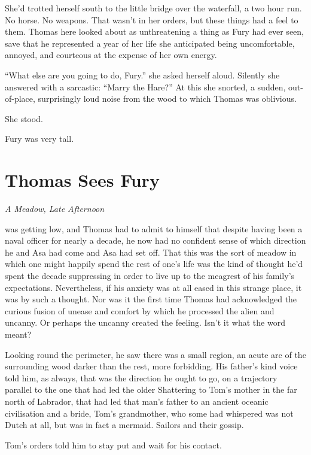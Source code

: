 \documentclass[11pt,a5paper]{article}
\newcommand{\alet}[1]{\textit{#1}\vspace{1em}}
\begin{document}
She'd trotted herself south to the little bridge over the waterfall, a two hour run. No horse. No weapons. That wasn't in her orders, but these things had a feel to them. Thomas here looked about as unthreatening a thing as Fury had ever seen, save that he represented a year of her life she anticipated being uncomfortable, annoyed, and courteous at the expense of her own energy.

``What else are you going to do, Fury.'' she asked herself aloud. Silently she answered with a sarcastic: ``Marry the Hare?'' At this she snorted, a sudden, out-of-place, surprisingly loud noise from the wood to which Thomas was oblivious.

She stood.

Fury was very tall.

\newpage

\section{Thomas Sees Fury}

\alet{A Meadow, Late Afternoon}

 was getting low, and Thomas had to admit to himself that despite having been a naval officer for nearly a decade, he now had no confident sense of which direction he and Asa had come and Asa had set off. That this was the sort of meadow in which one might happily spend the rest of one's life was the kind of thought he'd spent the decade suppressing in order to live up to the meagrest of his family's expectations. Nevertheless, if his anxiety was at all eased in this strange place, it was by such a thought. Nor was it the first time Thomas had acknowledged the curious fusion of unease and comfort by which he processed the alien and uncanny. Or perhaps the uncanny created the feeling. Isn't it what the word meant?

Looking round the perimeter, he saw there was a small region, an acute arc of the surrounding wood darker than the rest, more forbidding. His father's kind voice told him, as always, that was the direction he ought to go, on a trajectory parallel to the one that had led the older Shattering to Tom's mother in the far north of Labrador, that had led that man's father to an ancient oceanic civilisation and a bride, Tom's grandmother, who some had whispered was not Dutch at all, but was in fact a mermaid. Sailors and their gossip.

Tom's orders told him to stay put and wait for his contact.
\end{document}
